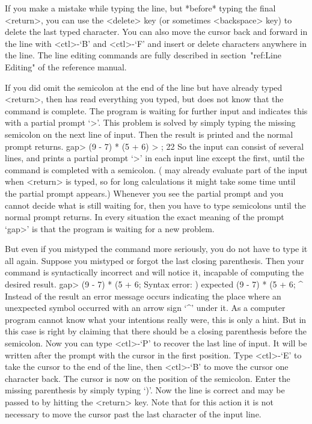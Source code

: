 If you make a mistake while typing the line,
but *before* typing the final <return>,
you can use the <delete> key (or sometimes <backspace> key)
to delete the last typed character.
You can also move the cursor back and forward in the line with <ctl>-`B'
and <ctl>-`F' and insert or delete characters anywhere in the line.
The line editing commands are fully described
in section~"ref:Line Editing" of the reference manual.

If you did omit the semicolon at the end of  the line but have already
typed  <return>, then {\GAP} has  read  everything you typed, but does
not know  that the command  is  complete.  The program is  waiting for
further  input and indicates  this with  a  partial prompt `>'.   This
problem is solved by simply  typing the missing  semicolon on the next
line  of  input. Then  the result  is printed   and  the normal prompt
returns.
\beginexample
gap> (9 - 7) * (5 + 6)
> ;
22
\endexample
So the input can consist of several lines, and {\GAP} prints a partial
prompt `>' in each input line except the first, until the command is
completed with a semicolon.
({\GAP} may already evaluate part of the input when <return> is typed,
so for long calculations it might take some time until the partial prompt
appears.)
Whenever you see the partial prompt and you cannot decide what {\GAP} is
still  waiting for, then  you have  to type  semicolons  until the normal
prompt returns.
In  every situation the exact meaning of the prompt `gap>' is that the
program is waiting for a new problem.

But even if you  mistyped the command more  seriously, you do not have to
type   it all again. Suppose   you  mistyped or  forgot  the last closing
parenthesis. Then your command is syntactically incorrect and {\GAP} will
notice it, incapable of computing the desired result.
\begintt
gap> (9 - 7) * (5 + 6;
Syntax error: ) expected
(9 - 7) * (5 + 6;
                ^
\endtt
{}
Instead of the result an error message  occurs indicating the place where
an unexpected  symbol occurred with   an arrow sign  `^'  under it.  As a
computer program  cannot know what your  intentions really were,  this is
only  a hint. But in this  case {\GAP}  is  right by  claiming that there
should be a closing  parenthesis before the  semicolon. Now you  can type
<ctl>-`P' to recover the last line of input. It will be written after the
prompt with the cursor in the first  position. Type <ctl>-`E' to take the
cursor  to the end of   the line, then <ctl>-`B'   to move the cursor one
character back. The cursor is now on the position of the semicolon. Enter
the missing parenthesis by simply typing `)'. Now the line is correct and
may be passed to {\GAP}  by hitting the <return>  key. Note that for this
action it is not necessary to move the cursor  past the last character of
the input line.

